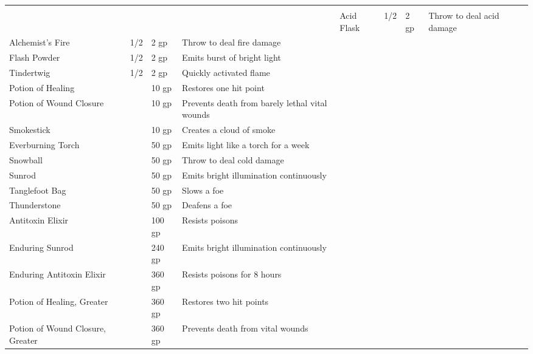 
\begin{longtablewrapper}
\begin{longtable}{p{15em} p{3em} p{6em} p{25em} p{3em}}

 \\
 &  &  &  &  \tableheaderrule
Acid Flask & 1/2 & 2 gp & Throw to deal acid damage & \pageref{item:Acid Flask} \\
Alchemist's Fire & 1/2 & 2 gp & Throw to deal fire damage & \pageref{item:Alchemist's Fire} \\
Flash Powder & 1/2 & 2 gp & Emits burst of bright light & \pageref{item:Flash Powder} \\
Tindertwig & 1/2 & 2 gp & Quickly activated flame & \pageref{item:Tindertwig} \\
Potion of Healing &  & 10 gp & Restores one hit point & \pageref{item:Potion of Healing} \\
Potion of Wound Closure &  & 10 gp & Prevents death from barely lethal vital wounds & \pageref{item:Potion of Wound Closure} \\
Smokestick &  & 10 gp & Creates a cloud of smoke & \pageref{item:Smokestick} \\
Everburning Torch &  & 50 gp & Emits light like a torch for a week & \pageref{item:Everburning Torch} \\
Snowball &  & 50 gp & Throw to deal cold damage & \pageref{item:Snowball} \\
Sunrod &  & 50 gp & Emits bright illumination continuously & \pageref{item:Sunrod} \\
Tanglefoot Bag &  & 50 gp & Slows a foe & \pageref{item:Tanglefoot Bag} \\
Thunderstone &  & 50 gp & Deafens a foe & \pageref{item:Thunderstone} \\
Antitoxin Elixir &  & 100 gp & Resists poisons & \pageref{item:Antitoxin Elixir} \\
Enduring Sunrod &  & 240 gp & Emits bright illumination continuously & \pageref{item:Enduring Sunrod} \\
Enduring Antitoxin Elixir &  & 360 gp & Resists poisons for 8 hours & \pageref{item:Enduring Antitoxin Elixir} \\
Potion of Healing, Greater &  & 360 gp & Restores two hit points & \pageref{item:Potion of Healing, Greater} \\
Potion of Wound Closure, Greater &  & 360 gp & Prevents death from vital wounds & \pageref{item:Potion of Wound Closure, Greater} \\

\end{longtable}
\end{longtablewrapper}
